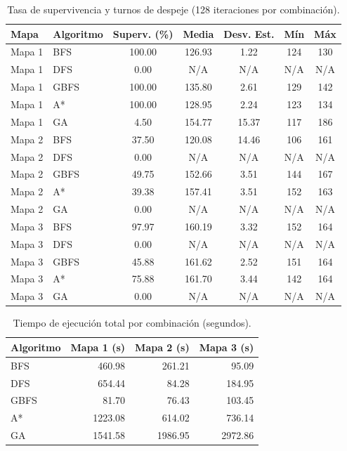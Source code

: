 \documentclass[11pt,a4paper]{article}
\begin{document}
\begin{table}[htbp]
\centering
\caption{Tasa de supervivencia y turnos de despeje (128 iteraciones por combinación).}
\label{tab:resultados}
\vspace{0.2cm}
\begin{tabular}{llccccc}
\toprule
\textbf{Mapa} & \textbf{Algoritmo} & \textbf{Superv. (\%)} & \textbf{Media} & \textbf{Desv. Est.} & \textbf{Mín} & \textbf{Máx} \\
\midrule
Mapa 1 & BFS  & 100.00 & 126.93 & 1.22 & 124 & 130 \\
Mapa 1 & DFS  & 0.00   & N/A    & N/A  & N/A & N/A \\
Mapa 1 & GBFS & 100.00 & 135.80 & 2.61 & 129 & 142 \\
Mapa 1 & A*   & 100.00 & 128.95 & 2.24 & 123 & 134 \\
Mapa 1 & GA   & 4.50   & 154.77 & 15.37 & 117 & 186 \\
\midrule
Mapa 2 & BFS  & 37.50  & 120.08 & 14.46 & 106 & 161 \\
Mapa 2 & DFS  & 0.00   & N/A    & N/A  & N/A & N/A \\
Mapa 2 & GBFS & 49.75  & 152.66 & 3.51 & 144 & 167 \\
Mapa 2 & A*   & 39.38  & 157.41 & 3.51 & 152 & 163 \\
Mapa 2 & GA   & 0.00   & N/A    & N/A  & N/A & N/A \\
\midrule
Mapa 3 & BFS  & 97.97  & 160.19 & 3.32 & 152 & 164 \\
Mapa 3 & DFS  & 0.00   & N/A    & N/A  & N/A & N/A \\
Mapa 3 & GBFS & 45.88  & 161.62 & 2.52 & 151 & 164 \\
Mapa 3 & A*   & 75.88  & 161.70 & 3.44 & 142 & 164 \\
Mapa 3 & GA   & 0.00   & N/A    & N/A  & N/A & N/A \\
\bottomrule
\end{tabular}
\end{table}

\begin{table}[htbp]
\centering
\caption{Tiempo de ejecución total por combinación (segundos).}
\label{tab:tiempos}
\vspace{0.2cm}
\begin{tabular}{lrrr}
\toprule
\textbf{Algoritmo} & \textbf{Mapa 1 (s)} & \textbf{Mapa 2 (s)} & \textbf{Mapa 3 (s)} \\
\midrule
BFS  & 460.98  & 261.21  & 95.09   \\
DFS  & 654.44  & 84.28   & 184.95  \\
GBFS & 81.70   & 76.43   & 103.45  \\
A*   & 1223.08 & 614.02  & 736.14  \\
GA   & 1541.58 & 1986.95 & 2972.86 \\
\bottomrule
\end{tabular}
\end{table}
\end{document}
